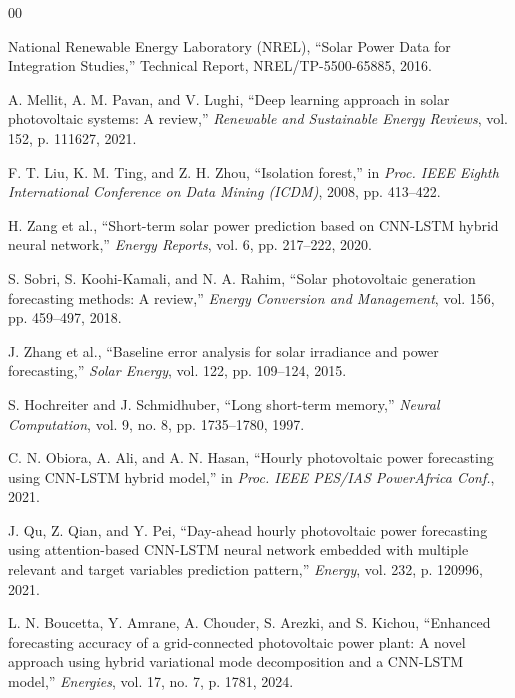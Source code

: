 \documentclass[conference]{IEEEtran}
\begin{document}
\begin{thebibliography}{00}

 National Renewable Energy Laboratory (NREL), ``Solar Power Data for Integration Studies,'' Technical Report, NREL/TP-5500-65885, 2016.

 A. Mellit, A. M. Pavan, and V. Lughi, ``Deep learning approach in solar photovoltaic systems: A review,'' \textit{Renewable and Sustainable Energy Reviews}, vol. 152, p. 111627, 2021.

 F. T. Liu, K. M. Ting, and Z. H. Zhou, ``Isolation forest,'' in \textit{Proc. IEEE Eighth International Conference on Data Mining (ICDM)}, 2008, pp. 413--422.

 H. Zang et al., ``Short-term solar power prediction based on CNN-LSTM hybrid neural network,'' \textit{Energy Reports}, vol. 6, pp. 217--222, 2020.

 S. Sobri, S. Koohi-Kamali, and N. A. Rahim, ``Solar photovoltaic generation forecasting methods: A review,'' \textit{Energy Conversion and Management}, vol. 156, pp. 459--497, 2018.

 J. Zhang et al., ``Baseline error analysis for solar irradiance and power forecasting,'' \textit{Solar Energy}, vol. 122, pp. 109--124, 2015.

 S. Hochreiter and J. Schmidhuber, ``Long short-term memory,'' \textit{Neural Computation}, vol. 9, no. 8, pp. 1735--1780, 1997.

 C. N. Obiora, A. Ali, and A. N. Hasan, ``Hourly photovoltaic power forecasting using CNN-LSTM hybrid model,'' in \textit{Proc. IEEE PES/IAS PowerAfrica Conf.}, 2021.

 J. Qu, Z. Qian, and Y. Pei, ``Day-ahead hourly photovoltaic power forecasting using attention-based CNN-LSTM neural network embedded with multiple relevant and target variables prediction pattern,'' \textit{Energy}, vol. 232, p. 120996, 2021.

 L. N. Boucetta, Y. Amrane, A. Chouder, S. Arezki, and S. Kichou, ``Enhanced forecasting accuracy of a grid-connected photovoltaic power plant: A novel approach using hybrid variational mode decomposition and a CNN-LSTM model,'' \textit{Energies}, vol. 17, no. 7, p. 1781, 2024.


\end{thebibliography}
\end{document}
